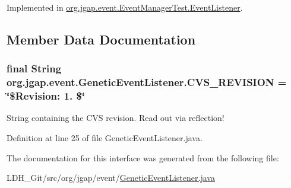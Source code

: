 Implemented in \hyperlink{classorg_1_1jgap_1_1event_1_1_event_manager_test_1_1_event_listener_a4f0a069aa11cd00c4d7df8ccf395db39}{org.\-jgap.\-event.\-Event\-Manager\-Test.\-Event\-Listener}.



\subsection{Member Data Documentation}
\hypertarget{interfaceorg_1_1jgap_1_1event_1_1_genetic_event_listener_a79b554a46c545ae2797b9b1b5c362e1a}{
\subsubsection[{C\-V\-S\-\_\-\-R\-E\-V\-I\-S\-I\-O\-N}]{\setlength{\rightskip}{0pt plus 5cm}final String org.\-jgap.\-event.\-Genetic\-Event\-Listener.\-C\-V\-S\-\_\-\-R\-E\-V\-I\-S\-I\-O\-N = \char`\"{}\$Revision\-: 1. \$\char`\"{}\hspace{0.3cm}{\ttfamily [static]}}}\label{interfaceorg_1_1jgap_1_1event_1_1_genetic_event_listener_a79b554a46c545ae2797b9b1b5c362e1a}
String containing the C\-V\-S revision. Read out via reflection! 

Definition at line 25 of file Genetic\-Event\-Listener.\-java.



The documentation for this interface was generated from the following file\-:\begin{DoxyCompactItemize}
\item 
L\-D\-H\-\_\-\-Git/src/org/jgap/event/\hyperlink{_genetic_event_listener_8java}{Genetic\-Event\-Listener.\-java}\end{DoxyCompactItemize}
